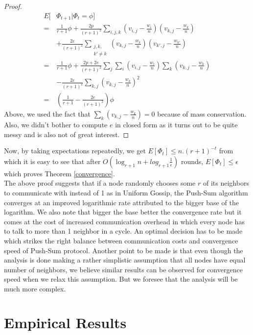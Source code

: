 \documentclass{article}
\begin{document}
\begin{proof}
\begingroup
\fontsize{8pt}{10pt}\selectfont
\begin{align*}
E[& \Phi_{t+1}|\Phi_t=\phi] \\ 
=& \frac{1}{r+1}\phi + \frac{2p}{(r+1)^2} \sum\limits_{i,j,k}(v_{i,j}-\frac{w_i}{n})(v_{k,j}-\frac{w_k}{n}) \\
&+ \frac{2e}{(r+1)^2} \sum\limits_{\substack{j,k, \\ k' \neq k}} (v_{k,j}-\frac{w_k}{n})(v_{k',j}-\frac{w_{k'}}{n}) \\
=& \frac{1}{r+1}\phi + \frac{2p+2e}{(r+1)^2}\sum\limits_j \sum\limits_i (v_{i,j} - \frac{w_i}{n}) \sum\limits_k(v_{k,j}-\frac{w_k}{n}) \\
&- \frac{2e}{(r+1)^2} \sum\limits_{k,j}(v_{k,j}-\frac{w_k}{n})^2 \\
=& \left( \frac{1}{r+1} - \frac{2e}{(r+1)^2} \right) \phi
\end{align*}
\endgroup
Above, we used the fact that $\sum\limits_k(v_{k,j}-\frac{w_k}{n})=0$ because of mass conservation. Also, we didn't bother to compute $e$ in closed form as it turns out to be quite messy and is also not of great interest.
\end{proof}
Now, by taking expectations repeatedly, we get $E[\Phi_t] \leq n.(r+1)^{-t}$ from which it is easy to see that after $O(\log_{r+1} n + log_{r+1} \frac{1}{\epsilon})$ rounds, $E[\Phi_t] \leq \epsilon$ which proves Theorem \ref{convergence}. \\
The above proof suggests that if a node randomly chooses some $r$ of its neighbors to communicate with instead of 1 as in Uniform Gossip, the Push-Sum algorithm converges at an improved logarithmic rate attributed to the bigger base of the logarithm. We also note that bigger the base better the convergence rate but it comes at the cost of increased communication overhead in which every node has to talk to more than 1 neighbor in a cycle. An optimal decision has to be made which strikes the right balance between communication costs and convergence speed of Push-Sum protocol. Another point to be made is that even though the analysis is done making a rather simplistic assumption that all nodes have equal number of neighbors, we believe similar results can be observed for convergence speed when we relax this assumption. But we foresee that the analysis will be much more complex.

\section{Empirical Results}
\end{document}
